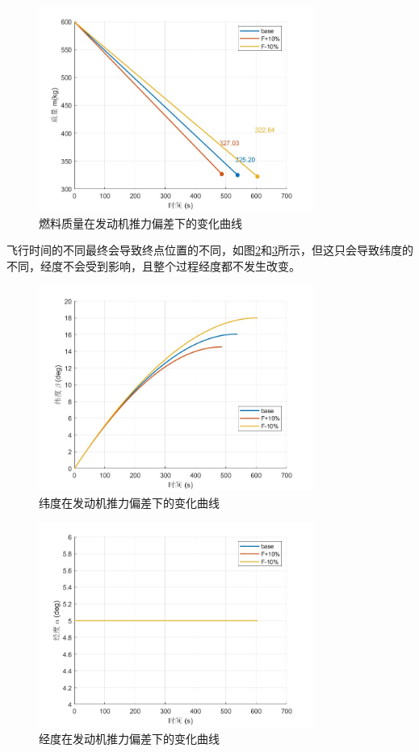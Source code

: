 \documentclass[12pt,a4paper]{article}
\begin{document}
\begin{figure}[H]
\centering
\includegraphics[width=0.8\textwidth]{figures/m_F.jpg}
\caption{燃料质量在发动机推力偏差下的变化曲线}
\label{fig:mF}
\end{figure}

飞行时间的不同最终会导致终点位置的不同，如图\ref{fig:betaF}和\ref{fig:alphaF}所示，但这只会导致纬度的不同，经度不会受到影响，且整个过程经度都不发生改变。

\begin{figure}[H]
\centering
\includegraphics[width=0.8\textwidth]{figures/beta_F.jpg}
\caption{纬度在发动机推力偏差下的变化曲线}
\label{fig:betaF}
\end{figure}

\begin{figure}[H]
\centering
\includegraphics[width=0.8\textwidth]{figures/alpha_F.jpg}
\caption{经度在发动机推力偏差下的变化曲线}
\label{fig:alphaF}
\end{figure}
\end{document}
